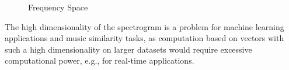 \begin{figure}[htbp]
	\centering
	\begin{subfigure}{0.5\textwidth}
		\centering
		\label{laylaspec}
	\end{subfigure}%
	\begin{subfigure}{0.5\textwidth}
		\centering
		\label{laylaspecfft}
	\end{subfigure}
	\caption{Frequency Space}
	\label{fig:test}
\end{figure}
\FloatBarrier
\noindent The high dimensionality of the spectrogram is a problem for machine learning applications and music similarity tasks, as computation based on vectors with such a high dimensionality on larger datasets would require excessive computational power, e.g., for real-time applications.
